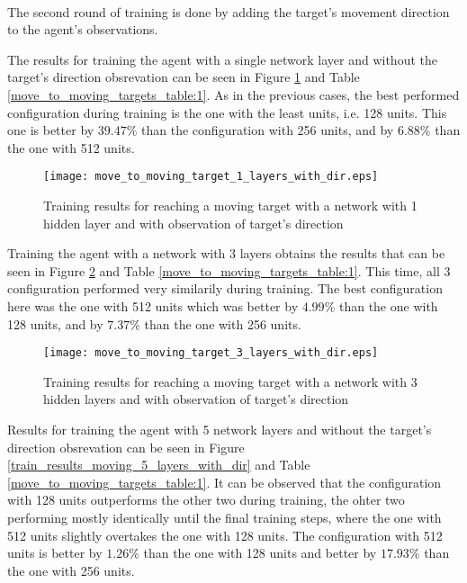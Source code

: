 \paragraph{}
The second round of training is done by adding the target's movement direction to the agent's observations.

The results for training the agent with a single network layer and without the target's direction obsrevation can be seen in Figure \ref{train_results_moving_1_layers_with_dir} and Table \ref{move_to_moving_targets_table:1}. As in the previous cases, the best performed configuration during training is the one with the least units, i.e. 128 units. This one is better by $39.47\%$ than the configuration with 256 units, and by $6.88\%$ than the one with 512 units.

\begin{figure}
    \begin{center}
        \texttt{[image: move\_to\_moving\_target\_1\_layers\_with\_dir.eps]}
        \caption{Training results for reaching a moving target with a network with 1 hidden layer and with observation of target's direction}
        \label{train_results_moving_1_layers_with_dir}
    \end{center}
\end{figure}

Training the agent with a network with 3 layers obtains the results that can be seen in Figure \ref{train_results_moving_3_layers_with_dir} and Table \ref{move_to_moving_targets_table:1}. This time, all 3 configuration performed very similarily during training. The best configuration here was the one with 512 units which was better by $4.99\%$ than the one with 128 units, and by $7.37\%$ than the one with 256 units.

\begin{figure}
    \begin{center}
        \texttt{[image: move\_to\_moving\_target\_3\_layers\_with\_dir.eps]}
        \caption{Training results for reaching a moving target with a network with 3 hidden layers and with observation of target's direction}
        \label{train_results_moving_3_layers_with_dir}
    \end{center}
\end{figure}

Results for training the agent with 5 network layers and without the target's direction obsrevation can be seen in Figure \ref{train_results_moving_5_layers_with_dir} and Table \ref{move_to_moving_targets_table:1}. It can be observed that the configuration with 128 units outperforms the other two during training, the ohter two performing mostly identically until the final training steps, where the one with 512 units slightly overtakes the one with 128 units. The configuration with 512 units is better by $1.26\%$ than the one with 128 units and better by $17.93\%$ than the one with 256 units.

